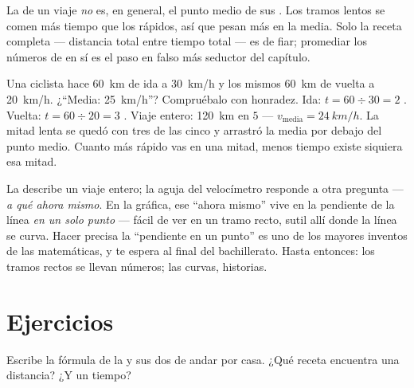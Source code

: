 \begin{proposition}[La trampa]\label{prop:g7:motion-average-speed:trap}
La  de un viaje \emph{no} es, en general, el punto
medio de sus . Los tramos lentos se comen más tiempo que
los rápidos, así que pesan más en la media. Solo la receta completa
--- distancia total entre tiempo total --- es de fiar; promediar los
números de  en sí es el paso en falso más seductor del
capítulo.
\end{proposition}

\begin{example}\label{ex:g7:motion-average-speed:sprung}
Una ciclista hace \qty{60}{km} de ida a \qty{30}{km/h} y los mismos
\qty{60}{km} de vuelta a \qty{20}{km/h}. ¿``Media: \qty{25}{km/h}''?
Compruébalo con honradez. Ida: $t = 60 \div 30 = 2$ . Vuelta:
$t = 60 \div 20 = 3$ . Viaje entero: \qty{120}{km} en $5$
 --- $v_{\text{media}} = \qty{24}{km/h}$. La mitad lenta se
quedó con tres de las cinco  y arrastró la media por debajo del
punto medio. Cuanto más rápido vas en una mitad, menos tiempo existe
siquiera esa mitad.
\end{example}

\begin{remark}\label{rem:g7:motion-average-speed:speedometer}
La  describe un viaje entero; la aguja del velocímetro
responde a otra pregunta --- \emph{a qué  ahora mismo}. En la
gráfica, ese ``ahora mismo'' vive en la pendiente de la línea \emph{en
un solo punto} --- fácil de ver en un tramo recto, sutil allí donde la
línea se curva. Hacer precisa la ``pendiente en un punto'' es uno de
los mayores inventos de las matemáticas, y te espera al final del
bachillerato. Hasta entonces: los tramos rectos se llevan números; las
curvas, historias.
\end{remark}

\section{Ejercicios}

\begin{exercise}[$\star$]\label{exo:g7:motion-average-speed:1}
Escribe la fórmula de la  y sus dos  de andar por
casa. ¿Qué receta encuentra una distancia? ¿Y un tiempo?
\end{exercise}


